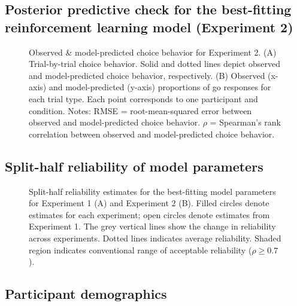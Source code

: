 \documentclass[a4paper,12pt]{article}
\begin{document}
\begin{refsection}[supp]
\clearpage
\subsection*{Posterior predictive check for the best-fitting reinforcement learning model (Experiment 2)}

\begin{figure}[h]
    \centerline{}
     \caption{Observed \& model-predicted choice behavior for Experiment 2. (A) Trial-by-trial choice behavior. Solid and dotted lines depict observed and model-predicted choice behavior, respectively. (B) Observed (x-axis) and model-predicted (y-axis) proportions of go responses for each trial type. Each point corresponds to one participant and condition. Notes: RMSE = root-mean-squared error between observed and model-predicted choice behavior. $\rho$ = Spearman's rank correlation between observed and model-predicted choice behavior.}
    \label{fig:exp2_ppc}
\end{figure}

\clearpage
\subsection*{Split-half reliability of model parameters}

\begin{figure}[h]
    \centerline{}
    \caption{Split-half reliability estimates for the best-fitting model parameters for Experiment 1 (A) and Experiment 2 (B). Filled circles denote estimates for each experiment; open circles denote estimates from Experiment 1. The grey vertical lines show the change in reliability across experiments. Dotted lines indicates average reliability. Shaded region indicates conventional range of acceptable reliability ($\rho \geq 0.7$).}
    \label{fig:figS04}
\end{figure}

\clearpage
\subsection*{Participant demographics}


\end{refsection}
\end{document}
